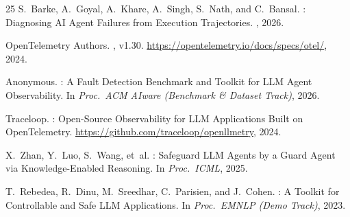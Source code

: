 \documentclass[11pt]{article}
\begin{document}
\begin{thebibliography}{25}
S.~Barke, A.~Goyal, A.~Khare, A.~Singh, S.~Nath, and C.~Bansal.
: Diagnosing AI Agent Failures from Execution Trajectories.
, 2026.

{OpenTelemetry Authors}.
, v1.30.
\newblock \url{https://opentelemetry.io/docs/specs/otel/}, 2024.

Anonymous.
: A Fault Detection Benchmark and Toolkit for {LLM} Agent Observability.
\newblock In {\em Proc.\ ACM AIware (Benchmark \& Dataset Track)}, 2026.

{Traceloop}.
: Open-Source Observability for {LLM} Applications
  Built on {OpenTelemetry}.
\newblock \url{https://github.com/traceloop/openllmetry}, 2024.

X.~Zhan, Y.~Luo, S.~Wang, et~al.
: Safeguard {LLM} Agents by a Guard Agent via
  Knowledge-Enabled Reasoning.
\newblock In {\em Proc.\ ICML}, 2025.

T.~Rebedea, R.~Dinu, M.~Sreedhar, C.~Parisien, and J.~Cohen.
: A Toolkit for Controllable and Safe {LLM}
  Applications.
\newblock In {\em Proc.\ EMNLP (Demo Track)}, 2023.

\end{thebibliography}

\end{document}

